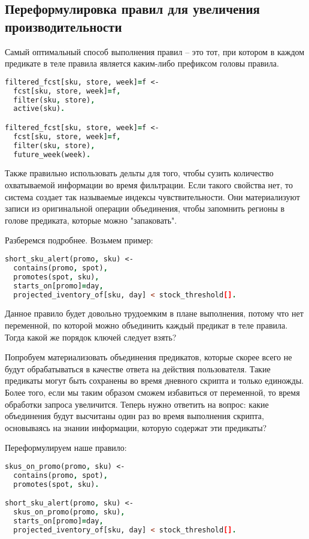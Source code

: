 \subsection{Переформулировка правил для увеличения производительности}
\label{sec:optimization:data_repr:rule_split}

Самый оптимальный способ выполнения правил – это тот, при котором в каждом предикате в теле правила является каким-либо префиксом головы правила.

\begin{lstlisting}[language=Prolog]
filtered_fcst[sku, store, week]=f <-
  fcst[sku, store, week]=f,
  filter(sku, store),
  active(sku).

filtered_fcst[sku, store, week]=f <-
  fcst[sku, store, week]=f,
  filter(sku, store),
  future_week(week).
\end{lstlisting}

Также правильно использовать дельты для того, чтобы сузить количество охватываемой информации во время фильтрации. Если такого свойства нет, то система создает так называемые индексы чувствительности. Они материализуют записи из оригинальной операции объединения, чтобы запомнить регионы в голове предиката, которые можно "запаковать".

Разберемся подробнее. Возьмем пример:

\begin{lstlisting}[language=Prolog]
short_sku_alert(promo, sku) <-
  contains(promo, spot),
  promotes(spot, sku),
  starts_on[promo]=day,
  projected_iventory_of[sku, day] < stock_threshold[].
\end{lstlisting}

Данное правило будет довольно трудоемким в плане выполнения, потому что нет переменной, по которой можно объединить каждый предикат в теле правила. Тогда какой же порядок ключей следует взять?

Попробуем материализовать объединения предикатов, которые скорее всего не будут обрабатываться в качестве ответа на действия пользователя. Такие предикаты могут быть сохранены во время дневного скрипта и только единожды. Более того, если мы таким образом сможем избавиться от переменной, то время обработки запроса увеличится. Теперь нужно ответить на вопрос: какие объединения будут высчитаны один раз во время выполнения скрипта, основываясь на знании информации, которую содержат эти предикаты?

Переформулируем наше правило:

\begin{lstlisting}[language=Prolog]
skus_on_promo(promo, sku) <-
  contains(promo, spot),
  promotes(spot, sku).

short_sku_alert(promo, sku) <-
  skus_on_promo(promo, sku),
  starts_on[promo]=day,
  projected_iventory_of[sku, day] < stock_threshold[].
\end{lstlisting}

